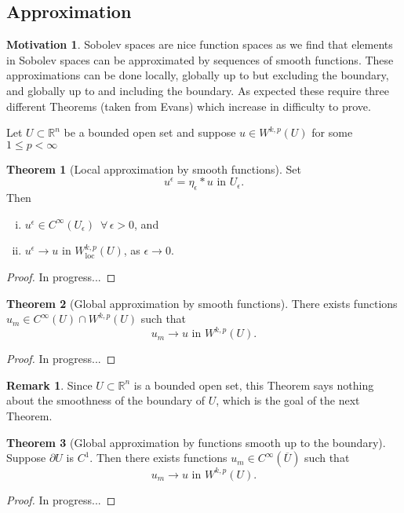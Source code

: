 \documentclass[11pt]{article}
\theoremstyle{definition}
\newtheorem*{theorem}{Theorem}
\newtheorem*{remark}{Remark}
\newtheorem*{motivation}{Motivation}
\begin{document}
\subsection{Approximation}
\begin{motivation}
Sobolev spaces are nice function spaces as we find that elements in Sobolev spaces can be approximated by sequences of smooth functions.
These approximations can be done locally, globally up to but excluding the boundary, and globally up to and including the boundary.
As expected these require three different Theorems (taken from Evans) which increase in difficulty to prove.
\end{motivation}
Let $U \subset \mathbb{R}^n$ be a bounded open set and suppose $u \in W^{k,p}(U)$ for some $1 \leq p < \infty$
\begin{theorem}[Local approximation by smooth functions]
Set
	\[u^{\epsilon} = \eta_{\epsilon} * u \text{ in } U_{\epsilon}.\]
Then
	\begin{enumerate}[(i)]
		\item $u^{\epsilon} \in C^{\infty}(U_{\epsilon}) \,\,\, \forall \, \epsilon > 0$, and
		\item $u^{\epsilon} \rightarrow u \text{ in } W_{\text{loc}}^{k,p}(U)$, as $\epsilon \rightarrow 0$.
	\end{enumerate}
\end{theorem}
\begin{proof}
In progress...
\end{proof}

\begin{theorem}[Global approximation by smooth functions]
	There exists functions $u_m \in C^{\infty}(U)\cap W^{k,p}(U)$ such that
	\[u_m \rightarrow u \text{ in } W^{k,p}(U).\]
\end{theorem}
\begin{proof}
In progress...
\end{proof}

\begin{remark}
Since $U \subset \mathbb{R}^n$ is a bounded open set, this Theorem says
nothing about the smoothness of the boundary of $U$, which is the goal of the next Theorem.
\end{remark}

\begin{theorem}[Global approximation by functions smooth up to the boundary]
	Suppose $\partial U$ is $C^1$.
	Then there exists functions $u_m \in C^{\infty}(\overline{U})$ such that
	\[u_m \rightarrow u \text{ in } W^{k,p}(U).\]
\end{theorem}
\begin{proof}
In progress...
\end{proof}
\end{document}
